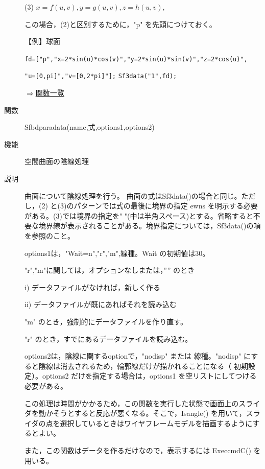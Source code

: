 \documentclass[papersize,a4paper,12pt,uplatex]{jsarticle}
\begin{document}
\begin{description}
(3) $x=f(u,v),y=g(u,v),z=h(u,v),$

  この場合，(2)と区別するために，"p" を先頭につけておく。
  
 \vspace{\baselineskip}
 【例】球面
 
 \verb|fd=["p","x=2*sin(u)*cos(v)","y=2*sin(u)*sin(v)","z=2*cos(u)",|
    
\verb|"u=[0,pi]","v=[0,2*pi]"];|
\verb|Sf3data("1",fd);|

\begin{center}  \end{center}

\begin{flushright} \hyperlink{functionlist}{$\Rightarrow$関数一覧}\end{flushright}

\hypertarget{sfbdparadata}{}
\item[関数]  Sfbdparadata(name,式,options1,options2)
\item[機能]  空間曲面の陰線処理
\item[説明]  曲面について陰線処理を行う。
  曲面の式はSf3data()の場合と同じ。ただし，(2) と(3)のパターンでは式の最後に境界の指定 ewns を明示する必要がある。(3)では境界の指定を" "(中は半角スペース)とする。省略すると不要な境界線が表示されることがある。境界指定については，Sf3data()の項を参照のこと。
  
options1は，"Wait=n","r","m",線種。Wait の初期値は30。

 "r","m"に関しては，オプションなしまたは，”” のとき
 
  i) データファイルがなければ，新しく作る
  
  ii) データファイルが既にあればそれを読み込む
  
"m"  のとき，強制的にデータファイルを作り直す。

"r" のとき，すでにあるデータファイルを読み込む。

options2は，陰線に関するoptionで，"nodisp" または 線種。"nodisp" にすると陰線は消去されるため，輪郭線だけが描かれることになる（ 初期設定）。options2 だけを指定する場合は，options1 を空リストにしてつける必要がある。

この処理は時間がかかるため，この関数を実行した状態で画面上のスライダを動かそうとすると反応が悪くなる。そこで，Isangle() を用いて，スライダの点を選択しているときはワイヤフレームモデルを描画するようにするとよい。

また，この関数はデータを作るだけなので，表示するには ExeccmdC() を用いる。


\end{description}
\end{document}

